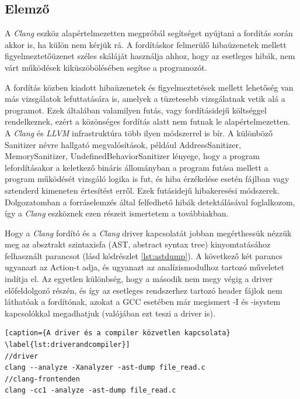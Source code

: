 \documentclass[a4paper,12pt]{report}
\begin{document}
\subsection*{Elemző}
A \emph{Clang} eszköz alapértelmezetten megpróbál segítséget nyújtani a fordítás során akkor is, ha külön nem kérjük rá. A fordításkor felmerülő hibaüzenetek mellett figyelmeztetőüzenet széles skáláját használja ahhoz, hogy az esetleges hibák, nem várt működések kiküszöbölésében segítse a programozót.

A fordítás közben kiadott hibaüzenetek és figyelmeztetések mellett lehetőség van más vizsgálatok lefuttatására is, amelyek a tüzetesebb vizsgálatnak vetik alá a programot. Ezek általában valamilyen futás, vagy fordításidejű költséggel rendelkeznek, ezért a közönséges fordítás alatt nem futnak le alapértelmezetten.
A \emph{Clang} és \emph{LLVM} infrastruktúra több ilyen módszerrel is bír. A különböző Sanitizer névre hallgató megvalósítások, például AddressSanitizer, MemorySanitizer, UndefinedBehaviorSanitizer lényege, hogy a program lefordításakor a keletkező bináris állományban a program futása mellett a program működését vizsgáló logika is fut, és hiba érzékelése esetén fájlban vagy sztenderd kimeneten értesítést erről. Ezek futásidejű hibakeresési módszerek. Dolgozatomban a forráselemzés által felfedhető hibák detektálásával foglalkozom, így a \emph{Clang} eszköznek ezen részeit ismertetem a továbbiakban.

Hogy a \emph{Clang} fordító és a \emph{Clang} driver kapcsolatát jobban megérthessük nézzük meg az absztrakt szintaxisfa (AST, abstract syntax tree) kinyomtatásához felhasznált parancsot (lásd kódrészlet \ref{lst:astdump}). A következő két parancs ugyanazt az Action-t adja, és ugyanazt az analízismodulhoz tartozó műveletet indítja el. Az egyetlen különbség, hogy a második nem megy végig a driver előfeldolgozó részén, és így az esetleges rendszerhez tartozó header fájlok nem láthatóak a fordítónak, azokat a GCC esetében már megismert -I és -isystem kapcsolókkal megadhatjuk (valójában ezt teszi a driver is).

\begin{lstlisting}[caption={A driver és a compiler közvetlen kapcsolata}
\label{lst:driverandcompiler}]
//driver
clang --analyze -Xanalyzer -ast-dump file_read.c
//clang-frontenden
clang -cc1 -analyze -ast-dump file_read.c
\end{lstlisting}
\end{document}
